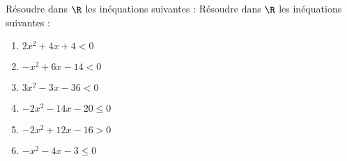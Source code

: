 \documentclass[a4paper,11pt,exos]{nsi} %
\begin{document}
\maketitle

Résoudre dans $\R$ les inéquations suivantes :
Résoudre dans $\R$ les inéquations suivantes :
\begin{multicols}{2}
    \begin{enumerate}[itemsep=1em]
        \item $2x^2+4x+4< 0$
	    \item $-x^2+6x-14< 0$
	    \item $3x^2-3x-36< 0$
	    \item $-2x^2-14x-20\leqslant 0$
	    \item $-2x^2+12x-16>0$
	    \item $-x^2-4x-3\leqslant 0$
    \end{enumerate}
\end{multicols}
\end{document}
